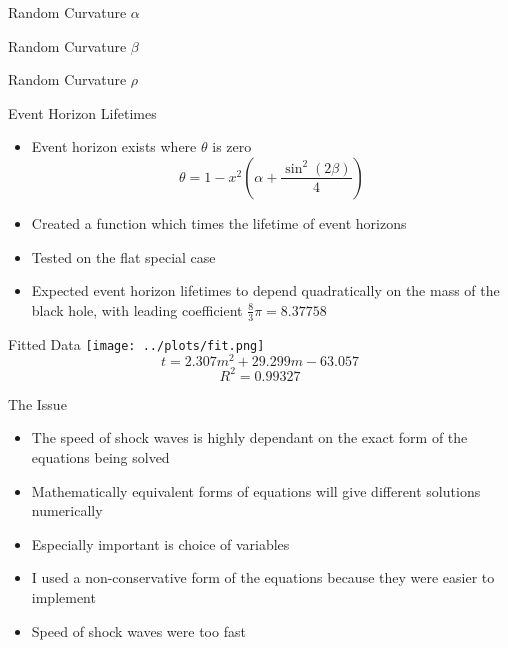 \documentclass[12pt]{beamer}
\begin{document}
\begin{frame}[shrink]{Random Curvature $\alpha$}
    \centering
\end{frame}

\begin{frame}[shrink]{Random Curvature $\beta$}
    \centering
\end{frame}

\begin{frame}[shrink]{Random Curvature $\rho$}
    \centering
\end{frame}

\begin{frame}{Event Horizon Lifetimes}
    \begin{itemize}
        \item Event horizon exists where $\theta$ is zero
            \[ \theta = 1 - x^2 \left( \alpha + \frac{\sin^2(2\beta)}{4} \right) \]
        \item Created a function which times the lifetime of event horizons
        \item Tested on the flat special case
        \item Expected event horizon lifetimes to depend quadratically on the mass of
            the black hole, with leading coefficient $\frac{8}{3}\pi = 8.37758$
    \end{itemize}
\end{frame}

\begin{frame}{Fitted Data}
    \centering
    \texttt{[image: ../plots/fit.png]}
    \[ t = 2.307m^2 + 29.299m - 63.057 \]
    \[ R^2 = 0.99327 \]
\end{frame}

\begin{frame}{The Issue}
    \begin{itemize}
        \item The speed of shock waves is highly dependant on the exact form of the
            equations being solved
        \item Mathematically equivalent forms of equations will give different solutions
            numerically
        \item Especially important is choice of variables
        \item I used a non-conservative form of the equations because they were easier
            to implement
        \item Speed of shock waves were too fast
    \end{itemize}
\end{frame}
\end{document}
